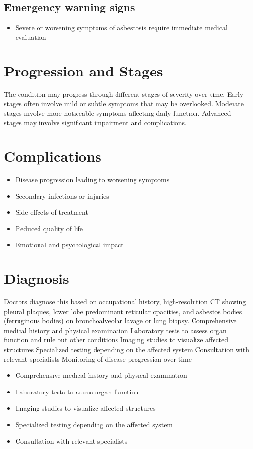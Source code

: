 \subsection{Emergency warning signs}
\begin{itemize}[noitemsep]
  \item Severe or worsening symptoms of asbestosis require immediate medical evaluation
\end{itemize}
\section{Progression and Stages}
The condition may progress through different stages of severity over time. Early stages often involve mild or subtle symptoms that may be overlooked. Moderate stages involve more noticeable symptoms affecting daily function. Advanced stages may involve significant impairment and complications.
\section{Complications}
\begin{itemize}[noitemsep]
  \item Disease progression leading to worsening symptoms
  \item Secondary infections or injuries
  \item Side effects of treatment
  \item Reduced quality of life
  \item Emotional and psychological impact
\end{itemize}
\section{Diagnosis}
Doctors diagnose this based on occupational history, high-resolution CT showing pleural plaques, lower lobe predominant reticular opacities, and asbestos bodies (ferruginous bodies) on bronchoalveolar lavage or lung biopsy. Comprehensive medical history and physical examination Laboratory tests to assess organ function and rule out other conditions Imaging studies to visualize affected structures Specialized testing depending on the affected system Consultation with relevant specialists Monitoring of disease progression over time

\begin{itemize}[noitemsep]
  \item Comprehensive medical history and physical examination
  \item Laboratory tests to assess organ function
  \item Imaging studies to visualize affected structures
  \item Specialized testing depending on the affected system
  \item Consultation with relevant specialists
\end{itemize}
